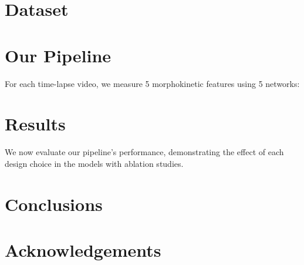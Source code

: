 \documentclass[runningheads]{llncs}
\begin{document}
\section{Dataset}


\section{Our Pipeline}
\label{sec:pipeline}
For each time-lapse video, we measure 5 morphokinetic features using 5 networks:











\section{Results}
We now evaluate our pipeline's performance, demonstrating the effect of each design choice in the models with ablation studies.


















\section{Conclusions}


\section*{Acknowledgements}




\end{document}
